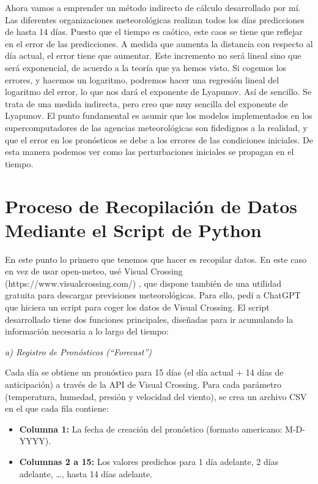 \documentclass[
  10pt,
  a4paper,
  DIV=11,
  numbers=noendperiod,
  open=any]{scrreprt}
\providecommand{\tightlist}{%
  \setlength{\itemsep}{0pt}\setlength{\parskip}{0pt}}
\numberwithin{equation}{chapter}
\numberwithin{equation}{section}
\renewcommand{\[}{\begin{equation}}
\renewcommand{\]}{\end{equation}}
\begin{document}
Ahora vamos a emprender un método indirecto de cálculo desarrollado por mí. Las diferentes
organizaciones meteorológicas realizan todos los días predicciones de
hasta 14 días. Puesto que el tiempo es caótico, este caos se tiene que
reflejar en el error de las predicciones. A medida que aumenta la
distancia con respecto al día actual, el error tiene que aumentar. Este
incremento no será lineal sino que será exponencial, de acuerdo a la
teoría que ya hemos visto. Si cogemos los errores, y hacemos un
logaritmo, podremos hacer una regresión lineal del logaritmo del error,
lo que nos dará el exponente de Lyapunov. Así de sencillo. Se trata de
una medida indirecta, pero creo que muy sencilla del exponente de
Lyapunov. El punto fundamental es asumir que los modelos implementados en los supercomputadores de las agencias meteorológicas son fidedignos a la realidad, y que el error en los pronósticos se debe a los errores de las condiciones iniciales. De esta manera podemos ver como las perturbaciones iniciales se propagan en el tiempo. 

\section{Proceso de Recopilación de Datos Mediante el Script de
Python}\label{proceso-de-recopilaciuxf3n-de-datos-mediante-el-script-de-python}

En este punto lo primero que tenemos que hacer es recopilar datos. En
este caso en vez de usar open-meteo, usé Visual Crossing
(https://www.visualcrossing.com/) , que dispone también de una utilidad
gratuita para descargar previsiones meteorológicas. Para ello, pedí a
ChatGPT que hiciera un script para coger los datos de Visual Crossing.
El script desarrollado tiene dos funciones principales, diseñadas para
ir acumulando la información necesaria a lo largo del tiempo:

\emph{a) Registro de Pronósticos (``Forecast'')}

Cada día se obtiene un pronóstico para 15 días (el día actual + 14 días
de anticipación) a través de la API de Visual Crossing. Para cada
parámetro (temperatura, humedad, presión y velocidad del viento), se
crea un archivo CSV en el que cada fila contiene:

\begin{itemize}
\tightlist
\item
  \textbf{Columna 1:} La fecha de creación del pronóstico (formato
  americano: M-D-YYYY).
\item
  \textbf{Columnas 2 a 15:} Los valores predichos para 1 día adelante, 2
  días adelante, \ldots, hasta 14 días adelante.
\end{itemize}
\end{document}
